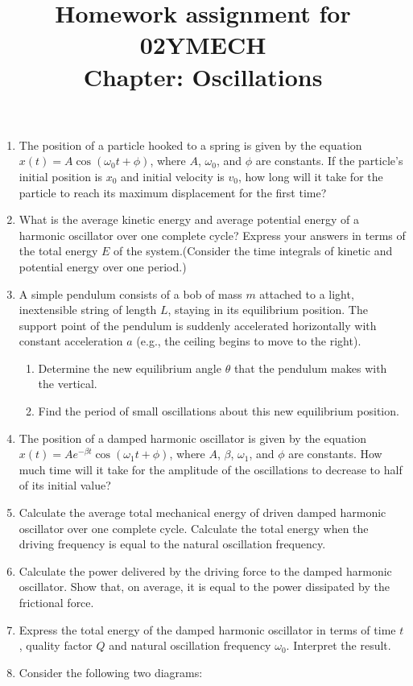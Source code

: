 \documentclass[12pt]{article}
\title{Homework assignment for 02YMECH \\ Chapter: Oscillations}
\begin{document}
\date{}
\maketitle
\vspace{-0.8in}

\begin{enumerate}
    \item The position of a particle hooked to a spring is given by the equation \( x(t)=A \cos(\omega_0 t + \phi) \), where \( A \), \( \omega_0 \), and \( \phi \) are constants. If the particle's initial position is $x_0$ and initial velocity is $v_0$, how long will it take for the particle to reach its maximum displacement for the first time?
    \item What is the average kinetic energy and average potential energy of a harmonic oscillator over one complete cycle? Express your answers in terms of the total energy \( E \) of the system.(Consider the time integrals of kinetic and potential energy over one period.)
    \item A simple pendulum consists of a bob of mass $m$ attached to a light, inextensible string of length $L$, staying in its equilibrium position. The support point of the pendulum is suddenly accelerated horizontally with constant acceleration $a$ (e.g., the ceiling begins to move to the right). 
    \begin{enumerate}
        \item Determine the new equilibrium angle \( \theta \) that the pendulum makes with the vertical.
        \item Find the period of small oscillations about this new equilibrium position.
    \end{enumerate}
    \item The position of a damped harmonic oscillator is given by the equation \( x(t) = A e^{-\beta t} \cos(\omega_1 t + \phi) \), where \( A \), \( \beta \), \( \omega_1 \), and \( \phi \) are constants. How much time will it take for the amplitude of the oscillations to decrease to half of its initial value?
    \item Calculate the average total mechanical energy of driven damped harmonic oscillator over one complete cycle. Calculate the total energy when the driving frequency is equal to the natural oscillation frequency.
    \item Calculate the power delivered by the driving force to the damped harmonic oscillator. Show that, on average, it is equal to the power dissipated by the frictional force.
    \item Express the total energy of the damped harmonic oscillator in terms of time \( t \), quality factor \( Q \) and natural oscillation frequency \( \omega_0 \). Interpret the result.
    \newpage
    \item Consider the following two diagrams:
\vspace{0.4cm}


\end{enumerate}
\end{document}
